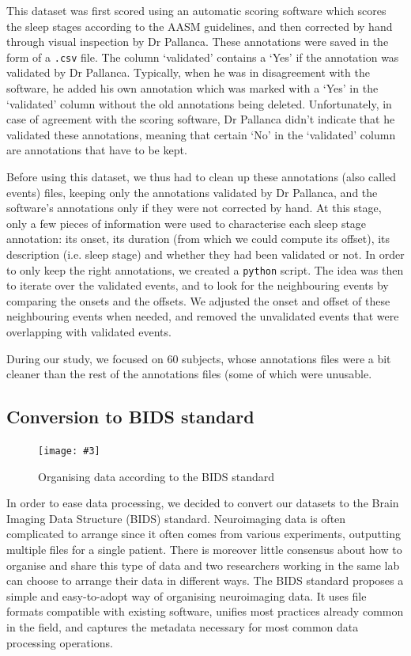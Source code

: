 \documentclass[titlepage, 11pt, a4paper, fancysections]{article}
\newcommand{\fig}[5]{\begin{figure}[#1] \centering \texttt{[image: \#3]} \caption{#4} \label{#5} \end{figure}}
\begin{document}
This dataset was first scored using an automatic scoring software which scores the sleep stages according to the AASM guidelines, and then corrected by hand through visual inspection by Dr Pallanca. These annotations were saved in the form of a \texttt{.csv} file. The column `validated' contains a `Yes' if the annotation was validated by Dr Pallanca. Typically, when he was in disagreement with the software, he added his own annotation which was marked with a `Yes' in the `validated' column without the old annotations being deleted. Unfortunately, in case of agreement with the scoring software, Dr Pallanca didn't indicate that he validated these annotations, meaning that certain `No' in the `validated' column are annotations that have to be kept.

Before using this dataset, we thus had to clean up these annotations (also called events) files, keeping only the annotations validated by Dr Pallanca, and the software's annotations only if they were not corrected by hand. At this stage, only a few pieces of information were used to characterise each sleep stage annotation: its onset, its duration (from which we could compute its offset), its description (i.e. sleep stage) and whether they had been validated or not. In order to only keep the right annotations, we created a \texttt{python} script. The idea was then to iterate over the validated events, and to look for the neighbouring events by comparing the onsets and the offsets. We adjusted the onset and offset of these neighbouring events when needed, and removed the unvalidated events that were overlapping with validated events. 

During our study, we focused on 60 subjects, whose annotations files were a bit cleaner than the rest of the annotations files (some of which were unusable. 

\subsection{Conversion to BIDS standard}

\fig{!ht}{\linewidth}{bids.png}{Organising data according to the BIDS standard}{fig:bids}
\vspace{1cm}

In order to ease data processing, we decided to convert our datasets to the Brain Imaging Data Structure (BIDS) \autocite{bids, bids-eeg} standard. Neuroimaging data is often complicated to arrange since it often comes from various experiments, outputting multiple files for a single patient. There is moreover little consensus about how to organise and share this type of data and two researchers working in the same lab can choose to arrange their data in different ways. The BIDS standard proposes a simple and easy-to-adopt way of organising neuroimaging data. It uses file formats compatible with existing software, unifies most practices already common in the field, and captures the metadata necessary for most common data processing operations.
\end{document}
